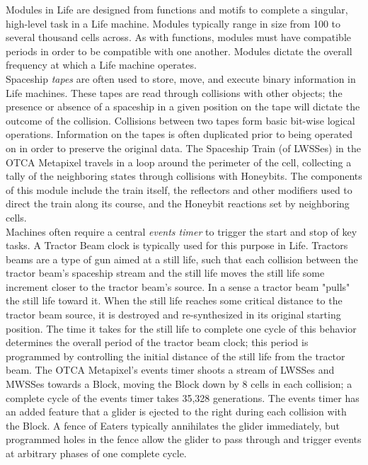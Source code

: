{Modules in Life are designed from functions and motifs to complete a singular, high-level task in a Life machine.  Modules typically range in size from 100 to several thousand cells across.  As with functions, modules must have compatible periods in order to be compatible with one another.  Modules dictate the overall frequency at which a Life machine operates.\\

Spaceship \textit{tapes} are often used to store, move, and execute binary information in Life machines.  These tapes are read through collisions with other objects; the presence or absence of a spaceship in a given position on the tape will dictate the outcome of the collision.  Collisions between two tapes form basic bit-wise logical operations.  Information on the tapes is often duplicated prior to being operated on in order to preserve the original data.  The Spaceship Train (of LWSSes) in the OTCA Metapixel travels in a loop around the perimeter of the cell, collecting a tally of the neighboring states through collisions with Honeybits.  The components of this module include the train itself, the reflectors and other modifiers used to direct the train along its course, and the Honeybit reactions set by neighboring cells.\\

Machines often require a central \textit{events timer} to trigger the start and stop of key tasks.  A Tractor Beam clock is typically used for this purpose in Life.  Tractors beams are a type of gun aimed at a still life, such that each collision between the tractor beam's spaceship stream and the still life moves the still life some increment closer to the tractor beam's source.  In a sense a tractor beam "pulls" the still life toward it.  When the still life reaches some critical distance to the tractor beam source, it is destroyed and re-synthesized in its original starting position.  The time it takes for the still life to complete one cycle of this behavior determines the overall period of the tractor beam clock; this period is programmed by controlling the initial distance of the still life from the tractor beam.  The OTCA Metapixel's events timer shoots a stream of LWSSes and MWSSes towards a Block, moving the Block down by 8 cells in each collision; a complete cycle of the events timer takes 35,328 generations.  The events timer has an added feature that a glider is ejected to the right during each collision with the Block.  A fence of Eaters typically annihilates the glider immediately, but programmed holes in the fence allow the glider to pass through and trigger events at arbitrary phases of one complete cycle.\\

}
